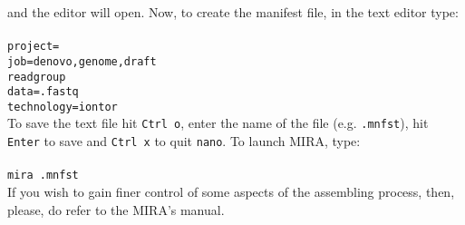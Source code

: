 and the editor will open. Now, to create the manifest file, in the text editor type:\\~\\
\texttt{project=\denovoReads\\
job=denovo,genome,draft\\
readgroup\\
data=\denovoReads.fastq\\
technology=iontor} \\

To save the text file hit \texttt{Ctrl o}, enter the name of the file (e.g. \texttt{\denovoReads.mnfst}),
hit \texttt{Enter} to save and \texttt{Ctrl x} to quit \texttt{nano}. To launch MIRA, type:\\~\\
\texttt{mira \denovoReads.mnfst}\\

If you wish to gain finer control of some aspects of the assembling process,
then, please, do refer to the MIRA's manual.

